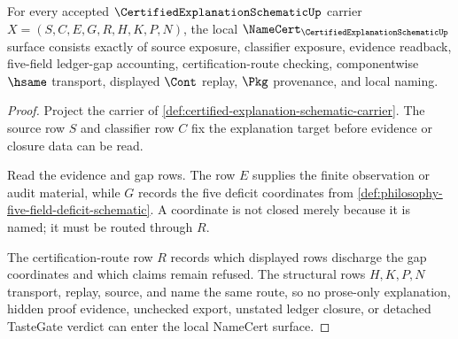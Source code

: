 \begin{theorem}
\label{thm:certified-explanation-schematic-namecert-obligations}
For every accepted $\CertifiedExplanationSchematicUp$ carrier $X=(S,C,E,G,R,H,K,P,N)$, the local $\NameCert_{\CertifiedExplanationSchematicUp}$ surface consists exactly of source exposure, classifier exposure, evidence readback, five-field ledger-gap accounting, certification-route checking, componentwise $\hsame$ transport, displayed $\Cont$ replay, $\Pkg$ provenance, and local naming.
\end{theorem}
\begin{proof}
Project the carrier of \autoref{def:certified-explanation-schematic-carrier}. The source row $S$ and classifier row $C$ fix the explanation target before evidence or closure data can be read.

Read the evidence and gap rows. The row $E$ supplies the finite observation or audit material, while $G$ records the five deficit coordinates from \autoref{def:philosophy-five-field-deficit-schematic}. A coordinate is not closed merely because it is named; it must be routed through $R$.

The certification-route row $R$ records which displayed rows discharge the gap coordinates and which claims remain refused. The structural rows $H,K,P,N$ transport, replay, source, and name the same route, so no prose-only explanation, hidden proof evidence, unchecked export, unstated ledger closure, or detached TasteGate verdict can enter the local NameCert surface.
\end{proof}

